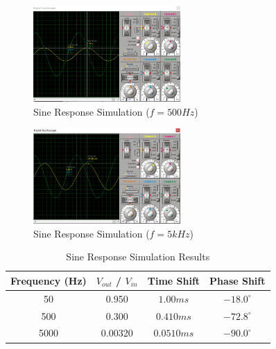 \documentclass [utf8] {article}
\begin{document}
{{        \begin{figure}[H]
            \begin{small}
                \begin{center}
                    \includegraphics[width=0.5\textwidth]{figures/Figure7.png}
                \end{center}
                \caption{Sine Response Simulation ($f = 500Hz$)}
                \label{fig:fig6}
            \end{small}
        \end{figure}

        \begin{figure}[H]
            \begin{small}
                \begin{center}
                    \includegraphics[width=0.5\textwidth]{figures/Figure8.png}
                \end{center}
                \caption{Sine Response Simulation ($f = 5kHz$)}
                \label{fig:fig7}
            \end{small}
        \end{figure}
        
        \begin{table}[h]
            \centering
            \begin{tabular}{|c|c|c|c|}
                \hline
                Frequency (Hz) & $V_{out}$ / $V_{in}$ & Time Shift & Phase Shift \\
                \hline
                50      &    0.950   &    $1.00ms$        & $-18.0^{\circ}$\\
                500     &    0.300  &    $0.410ms$        & $-72.8^{\circ}$\\
                5000    &    0.00320    &   $0.0510ms$         &    $-90.0^{\circ}$\\
                \hline            
            \end{tabular}
            \caption{Sine Response Simulation Results}
            \label{table:tb1}
        \end{table}

}}
\end{document}
